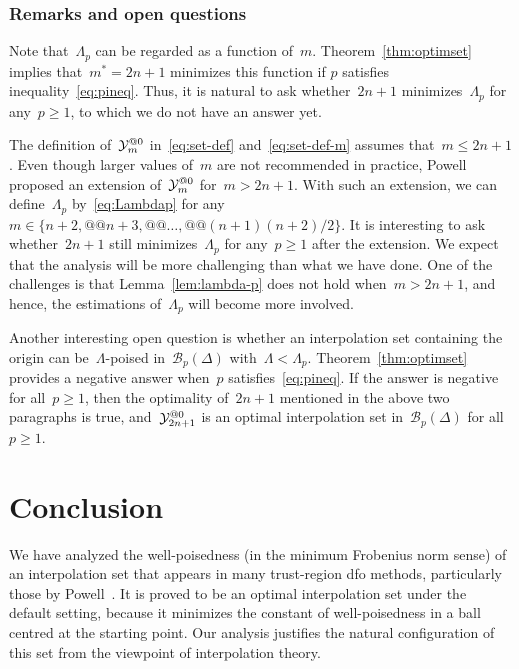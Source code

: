 \documentclass{article}
\makeatletter
\newcounter{cite}
\numberwithin{equation}{section}
\theoremstyle{definition}
\theoremstyle{plain}
\theoremstyle{remark}
\newcommand*{\set}[2][]{#1\{#2#1\}}
\newcommand*{\xpt}[1][]{\mathcal{Y}\ifblank{#1}{}{^{@#1}}}
\makeatother
\begin{document}
\subsubsection{Remarks and open questions}

Note that~$\Lambda_p$ can be regarded as a function of~$m$.
Theorem~\ref{thm:optimset} implies that~$m^\ast = 2n + 1$ minimizes this function if $p$ satisfies inequality~\eqref{eq:pineq}.
Thus, it is natural to ask whether~$2n+1$ minimizes~$\Lambda_p$ for any~$p \ge 1$, to which we do not have an answer yet.

The definition of~$\xpt[0]_m$ in~\eqref{eq:set-def} and~\eqref{eq:set-def-m} assumes that~$m \le 2n + 1$.
Even though larger values of~$m$ are not recommended in practice, Powell~\cite{Powell_2006} proposed an extension of~$\xpt[0]_m$ for~$m > 2n + 1$.
With such an extension, we can define~$\Lambda_p$ by~\eqref{eq:Lambdap} for any~$m \in \set{n + 2, @@ n +  3, @@ \dots, @@ (n + 1)(n + 2) / 2}$.
It is interesting to ask whether~$2n + 1$ still minimizes~$\Lambda_p$ for any~$p \ge 1$ after the extension.
We expect that the analysis will be more challenging than what we have done.
One of the challenges is that Lemma~\ref{lem:lambda-p} does not hold when~$m > 2n + 1$, and hence, the estimations of~$\Lambda_p$ will become more involved.

Another interesting open question is whether an interpolation set containing the origin can be~$\Lambda$-poised in~$\mathcal{B}_p(\Delta)$ with~$\Lambda < \Lambda_p$.
Theorem~\ref{thm:optimset} provides a negative answer when~$p$ satisfies~\eqref{eq:pineq}.
If the answer is negative for all~$p \ge 1$, then the optimality of~$2n + 1$ mentioned in the above two
paragraphs is true, and~$\xpt[0]_{2n + 1}$ is an optimal interpolation set in~$\mathcal{B}_p(\Delta)$ for all~$p \ge 1$.

\section{Conclusion}
\label{sec:conclusion}

We have analyzed the well-poisedness (in the minimum Frobenius norm sense) of an interpolation set that appears in many trust-region \gls{dfo} methods, particularly those by Powell~\cite{Powell_2006,Powell_2009}.
It is proved to be an optimal interpolation set under the default setting, because it minimizes the constant of well-poisedness in a ball centred at the starting point.
Our analysis justifies the natural configuration of this set from the viewpoint of interpolation theory.
\end{document}
